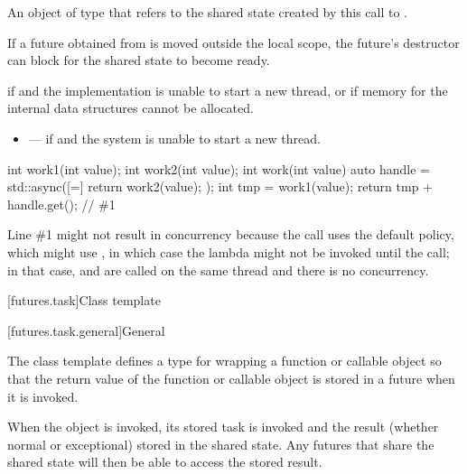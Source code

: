 \begin{itemdescr}
\pnum
\returns
An object of type
 that refers
to the shared state created by this call to .
\begin{note}
If a future obtained from  is moved outside the local scope,
the future's destructor can block for the shared state to become ready.
\end{note}

\pnum
\throws
{} if  and the
implementation is unable to start a new thread, or
 if memory for the internal data structures
cannot be allocated.

\pnum
\errors
\begin{itemize}
\item {} --- if
 and the system is unable to start a new thread.
\end{itemize}
\end{itemdescr}

\pnum
\begin{example}
\begin{codeblock}
int work1(int value);
int work2(int value);
int work(int value) {
  auto handle = std::async([=]{ return work2(value); });
  int tmp = work1(value);
  return tmp + handle.get();    // \#1
}
\end{codeblock}

\begin{note}
Line \#1 might not result in concurrency because
the  call uses the default policy, which might use
, in which case the lambda might not be invoked until the
 call; in that case,  and  are called on the
same thread and there is no concurrency.
\end{note}
\end{example}

[futures.task]{Class template }

[futures.task.general]{General}

\pnum
The class template  defines a type for wrapping a function or
callable object so that the return value of the function or callable object is stored in
a future when it is invoked.

\pnum
When the  object is invoked, its stored task is invoked and the
result (whether normal or exceptional) stored in the shared state. Any futures that
share the shared state will then be able to access the stored result.

